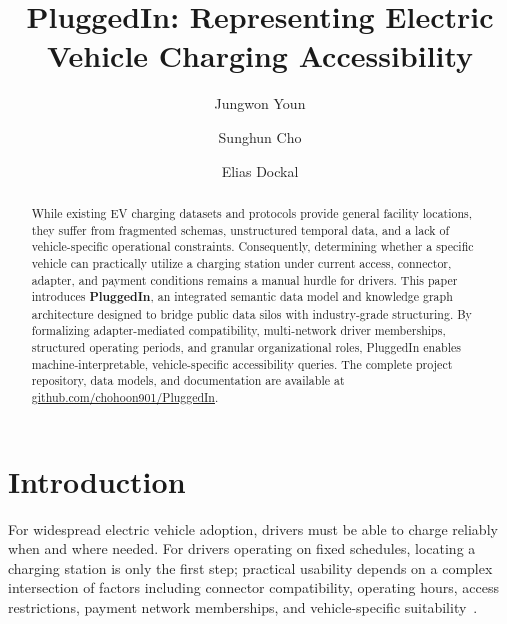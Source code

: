 \documentclass[sigconf]{acmart}
\begin{document}
\title{PluggedIn: Representing Electric Vehicle Charging Accessibility}

\author{Jungwon Youn}

\author{Sunghun Cho}

\author{Elias Dockal}

\begin{abstract}
While existing EV charging datasets and protocols provide general facility locations, they suffer from fragmented schemas, unstructured temporal data, and a lack of vehicle-specific operational constraints. Consequently, determining whether a specific vehicle can practically utilize a charging station under current access, connector, adapter, and payment conditions remains a manual hurdle for drivers. This paper introduces \textbf{PluggedIn}, an integrated semantic data model and knowledge graph architecture designed to bridge public data silos with industry-grade structuring. By formalizing adapter-mediated compatibility, multi-network driver memberships, structured operating periods, and granular organizational roles, PluggedIn enables machine-interpretable, vehicle-specific accessibility queries. The complete project repository, data models, and documentation are available at \url{github.com/chohoon901/PluggedIn}.
\end{abstract}


\maketitle

\section{Introduction}
For widespread electric vehicle adoption, drivers must be able to charge reliably when and where needed. For drivers operating on fixed schedules, locating a charging station is only the first step; practical usability depends on a complex intersection of factors including connector compatibility, operating hours, access restrictions, payment network memberships, and vehicle-specific suitability~\cite{qi2023evkg}. 
\end{document}
